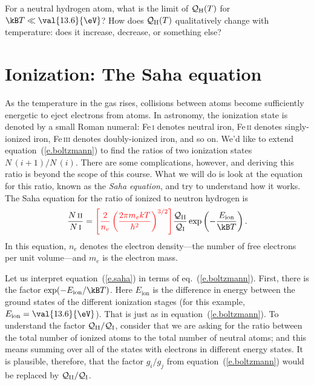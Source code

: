 \begin{exercisebox}
For a neutral hydrogen atom, what is the limit of $\mathcal{Q}_{\mathrm{H}}(T)$ for $\kB T \ll \val{13.6}{\eV}$?  How does $\mathcal{Q}_{\mathrm{H}}(T)$ qualitatively change with temperature: does it increase, decrease, or something else?
\end{exercisebox}

\section{Ionization: The Saha equation}
\label{s.saha-eqn}

As the temperature in the gas rises, collisions between atoms become sufficiently energetic to eject electrons from atoms.  In astronomy, the ionization state is denoted by a small Roman numeral: Fe\,\textsc{i} denotes neutral iron, Fe\,\textsc{ii} denotes singly-ionized iron, Fe\,\textsc{iii} denotes doubly-ionized iron, and so on. We'd like to extend equation~(\ref{e.boltzmann}) to find the ratios of two ionization states $N\,(i+1)/N\,(i)$.  There are some complications, however, and deriving this ratio is beyond the scope of this course. What we will do is look at the equation for this ratio, known as the \emph{Saha equation}, and try to understand how it works.  The Saha equation for the ratio of ionized to neutron hydrogen is
\begin{equation}\label{e.saha}
\frac{N\,\textrm{\scshape ii}}{N\,\textrm{\scshape i}} 
= {\color{red}\left[\frac{2}{n_{e}}
\left(\frac{2\pi m_{e}kT}{h^{2}}\right)^{3/2}\right]}
\frac{\pfcn_{\mathrm{II}}}{\pfcn_{\mathrm{I}}} \exp\left(-\frac{E_{\mathrm{ion}}}{\kB T}\right).
\end{equation}
In this equation, $n_{e}$ denotes the electron density---the number of free electrons per unit volume---and $m_{e}$ is the electron mass.

Let us interpret equation~(\ref{e.saha}) in terms of eq.~(\ref{e.boltzmann}).  First, there is the factor $\exp(-E_{\mathrm{ion}}/\kB T)$. Here $E_{\mathrm{ion}}$ is the difference in energy between the ground states of the different ionization stages (for this example, $E_{\mathrm{ion}} = \val{13.6}{\eV}$).  That is just as in equation~(\ref{e.boltzmann}). To understand the factor $\mathcal{Q}_{\mathrm{II}}/\mathcal{Q}_{\mathrm{I}}$, consider that we are asking for the ratio between the total number of ionized atoms to the total number of neutral atoms; and this means summing over all of the states with electrons in different energy states. It is plausible, therefore, that the factor $g_{i}/g_{j}$ from equation~(\ref{e.boltzmann}) would be replaced by $\mathcal{Q}_{\mathrm{II}}/\mathcal{Q}_{\mathrm{I}}$.

